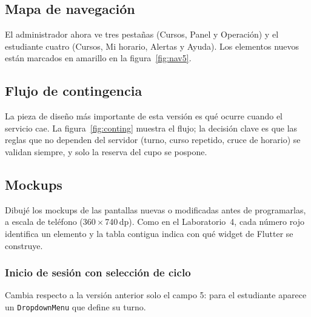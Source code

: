 \subsection{Mapa de navegación}
El administrador ahora ve tres pestañas (Cursos, Panel y Operación) y el estudiante cuatro (Cursos, Mi horario, Alertas y Ayuda). Los elementos nuevos están marcados en amarillo en la figura~\ref{fig:nav5}.


\subsection{Flujo de contingencia}
La pieza de diseño más importante de esta versión es qué ocurre cuando el servicio cae. La figura~\ref{fig:conting} muestra el flujo; la decisión clave es que las reglas que no dependen del servidor (turno, curso repetido, cruce de horario) se validan siempre, y solo la reserva del cupo se pospone.


\subsection{Mockups}
\label{sec:mockups5}
Dibujé los mockups de las pantallas nuevas o modificadas antes de programarlas, a escala de teléfono (360\,$\times$\,740\,dp). Como en el Laboratorio~4, cada número rojo identifica un elemento y la tabla contigua indica con qué widget de Flutter se construye.

\FloatBarrier
\subsubsection*{Inicio de sesión con selección de ciclo}
Cambia respecto a la versión anterior solo el campo 5: para el estudiante aparece un \texttt{DropdownMenu} que define su turno.

